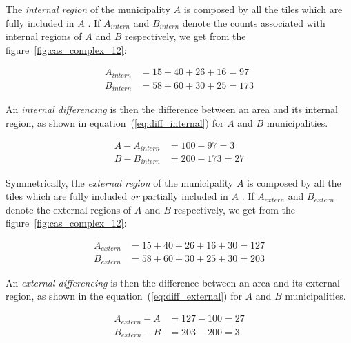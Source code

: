 The \textit{internal region} of the municipality $A$ is composed by all the tiles which are fully included in $A$ \citep{Costemalle_2019}. If $A_{intern}$ and $B_{intern}$ denote the counts associated with internal regions of $A$ and $B$ respectively, we get from the figure~\ref{fig:cas_complex_12}:

\begin{equation}
    \begin{split}
    A_{intern} &= 15+40+26+16 = 97 \\
    B_{intern} &= 58+60+30+25 = 173 
    \end{split}
    \label{eq:internal_regions}
\end{equation}

An \textit{internal differencing} is then the difference between an area and its internal region, as shown in equation~(\ref{eq:diff_internal}) for $A$ and $B$ municipalities.

\begin{equation}
    \begin{split}
    A - A_{intern} &= 100 - 97 = 3 \\
    B - B_{intern} &= 200 - 173 = 27 
    \end{split}
    \label{eq:diff_internal}
\end{equation}

Symmetrically, the \textit{external region} of the municipality $A$ is composed by all the tiles which are fully included \emph{or} partially included in $A$ \citep{Costemalle_2019}. If $A_{extern}$ and $B_{extern}$ denote the external regions of $A$ and $B$ respectively, we get from the figure~\ref{fig:cas_complex_12}:

\begin{equation}
    \begin{split}
    A_{extern} &= 15+40+26+16+30 = 127 \\
    B_{extern} &= 58+60+30+25+30 = 203 
    \end{split}
    \label{eq:external_regions}
\end{equation}

An \textit{external differencing} is then the difference between an area and its external region, as shown in the equation~(\ref{eq:diff_external}) for $A$ and $B$ municipalities.

\begin{equation}
    \begin{split}
    A_{extern} - A &= 127 - 100 = 27 \\
    B_{extern} - B &= 203 - 200 = 3 
    \end{split}
    \label{eq:diff_external}
\end{equation}

